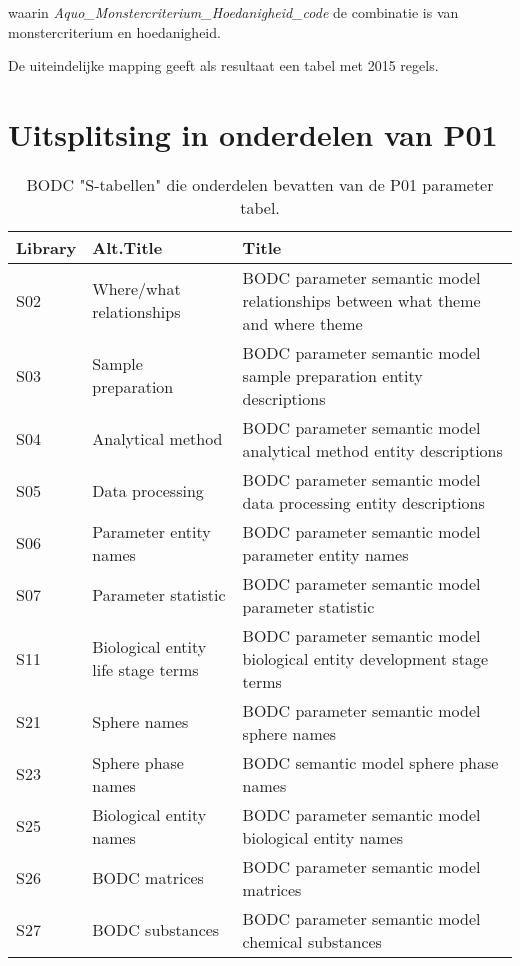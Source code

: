 \documentclass[
]{book}
\begin{document}
waarin \emph{Aquo\_Monstercriterium\_Hoedanigheid\_code} de combinatie is van monstercriterium en hoedanigheid.

De uiteindelijke mapping geeft als resultaat een tabel met 2015 regels.

\hypertarget{uitsplitsing-in-onderdelen-van-p01}{%
\section{Uitsplitsing in onderdelen van P01}\label{uitsplitsing-in-onderdelen-van-p01}}

\begin{table}

\caption{\label{tab:unnamed-chunk-5}BODC "S-tabellen" die onderdelen bevatten van de P01 parameter tabel.}
\centering
\fontsize{10}{12}\selectfont
\begin{tabu} to 
\hline
Library & Alt.Title & Title\\
\hline
S02 & Where/what relationships & BODC parameter semantic model relationships between what theme and where theme\\
\hline
S03 & Sample preparation & BODC parameter semantic model sample preparation entity descriptions\\
\hline
S04 & Analytical method & BODC parameter semantic model analytical method entity descriptions\\
\hline
S05 & Data processing & BODC parameter semantic model data processing entity descriptions\\
\hline
S06 & Parameter entity names & BODC parameter semantic model parameter entity names\\
\hline
S07 & Parameter statistic & BODC parameter semantic model parameter statistic\\
\hline
S11 & Biological entity life stage terms & BODC parameter semantic model biological entity development stage terms\\
\hline
S21 & Sphere names & BODC parameter semantic model sphere names\\
\hline
S23 & Sphere phase names & BODC semantic model sphere phase names\\
\hline
S25 & Biological entity names & BODC parameter semantic model biological entity names\\
\hline
S26 & BODC matrices & BODC parameter semantic model matrices\\
\hline
S27 & BODC substances & BODC parameter semantic model chemical substances\\
\hline
\end{tabu}
\end{table}
\end{document}
